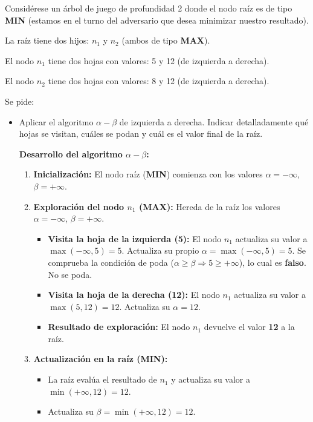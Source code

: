 \documentclass[11pt, a4paper]{article}
\newenvironment{problem}[1][Cuestión]{
	\vspace{0.5cm}
	\noindent{\Large\bfseries #1} \par\vspace{0.5cm}
}{
	\vspace{0.5cm}
}
\begin{document}
	\begin{problem}[Cuestión 6 (20\%)]
		Considérese un árbol de juego de profundidad 2 donde el nodo raíz es de tipo \textbf{MIN} (estamos en el turno del adversario que desea minimizar nuestro resultado).

		La raíz tiene dos hijos: $n_1$ y $n_2$ (ambos de tipo \textbf{MAX}).

		El nodo $n_1$ tiene dos hojas con valores: 5 y 12 (de izquierda a derecha).

		El nodo $n_2$ tiene dos hojas con valores: 8 y 12 (de izquierda a derecha).

		Se pide:

		\begin{itemize}[label=a)]
			\item Aplicar el algoritmo $\alpha-\beta$ de izquierda a derecha. Indicar detalladamente qué hojas se visitan, cuáles se podan y cuál es el valor final de la raíz.
				{ \color{blue} 
					\textbf{Desarrollo del algoritmo $\alpha-\beta$:}

					\begin{enumerate}
						\item \textbf{Inicialización:} El nodo raíz (\textbf{MIN}) comienza con los valores $\alpha = -\infty$, $\beta = +\infty$.

						\item \textbf{Exploración del nodo $n_1$ (\textbf{MAX}):} Hereda de la raíz los valores $\alpha = -\infty$, $\beta = +\infty$.
							\begin{itemize}
								\item \textbf{Visita la hoja de la izquierda (5):} El nodo $n_1$ actualiza su valor a $\max(-\infty, 5) = 5$. Actualiza su propio $\alpha = \max(-\infty, 5) = 5$. Se comprueba la condición de poda ($\alpha \ge \beta \Rightarrow 5 \ge +\infty$), lo cual es \textbf{falso}. No se poda.
								\item \textbf{Visita la hoja de la derecha (12):} El nodo $n_1$ actualiza su valor a $\max(5, 12) = 12$. Actualiza su $\alpha = 12$.
								\item \textbf{Resultado de exploración:} El nodo $n_1$ devuelve el valor \textbf{12} a la raíz.
							\end{itemize}

						\item \textbf{Actualización en la raíz (\textbf{MIN}):}
							\begin{itemize}
								\item La raíz evalúa el resultado de $n_1$ y actualiza su valor a $\min(+\infty, 12) = 12$.
								\item Actualiza su $\beta = \min(+\infty, 12) = 12$.
							\end{itemize}


\end{enumerate}}
\end{itemize}
\end{problem}
\end{document}
